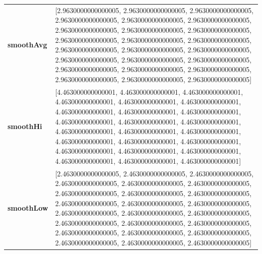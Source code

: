 		\begin{table}[H]
			\centering
			\begin{tabularx}{\textwidth}{lX}
		\textbf{smoothAvg}&  [2.9630000000000005, 2.9630000000000005, 2.9630000000000005, 2.9630000000000005, 2.9630000000000005, 2.9630000000000005, 2.9630000000000005, 2.9630000000000005, 2.9630000000000005, 2.9630000000000005, 2.9630000000000005, 2.9630000000000005, 2.9630000000000005, 2.9630000000000005, 2.9630000000000005, 2.9630000000000005, 2.9630000000000005, 2.9630000000000005, 2.9630000000000005, 2.9630000000000005, 2.9630000000000005, 2.9630000000000005, 2.9630000000000005, 2.9630000000000005] \\
		\textbf{smoothHi}& [4.463000000000001, 4.463000000000001, 4.463000000000001, 4.463000000000001, 4.463000000000001, 4.463000000000001, 4.463000000000001, 4.463000000000001, 4.463000000000001, 4.463000000000001, 4.463000000000001, 4.463000000000001, 4.463000000000001, 4.463000000000001, 4.463000000000001, 4.463000000000001, 4.463000000000001, 4.463000000000001, 4.463000000000001, 4.463000000000001, 4.463000000000001, 4.463000000000001, 4.463000000000001, 4.463000000000001] \\
		\textbf{smoothLow} &[2.4630000000000005, 2.4630000000000005, 2.4630000000000005, 2.4630000000000005, 2.4630000000000005, 2.4630000000000005, 2.4630000000000005, 2.4630000000000005, 2.4630000000000005, 2.4630000000000005, 2.4630000000000005, 2.4630000000000005, 2.4630000000000005, 2.4630000000000005, 2.4630000000000005, 2.4630000000000005, 2.4630000000000005, 2.4630000000000005, 2.4630000000000005, 2.4630000000000005, 2.4630000000000005, 2.4630000000000005, 2.4630000000000005, 2.4630000000000005]\\
		
	\end{tabularx} 
\end{table}



